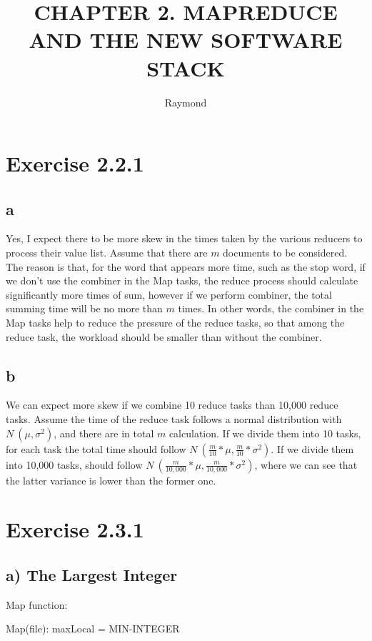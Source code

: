 \documentclass{article}
\title{CHAPTER 2. MAPREDUCE AND THE NEW SOFTWARE STACK}
\author{Raymond}
\begin{document}
\maketitle


\section{Exercise 2.2.1}
\subsection{a}
Yes, I expect there to be more skew in the times taken by the various reducers to process their value list. Assume that there are $m$ documents to be considered. The reason is that, for the word that appears more time, such as the stop word, if we don't use the combiner in the Map tasks, the reduce process should calculate significantly more times of sum, however if we perform combiner, the total summing time will be no more than $m$ times. In other words, the combiner in the Map tasks help to reduce the pressure of the reduce tasks, so that among the reduce task, the workload should be smaller than without the combiner. 

\subsection{b}

We can expect more skew if we combine 10 reduce tasks than 10,000 reduce tasks. Assume the time of the reduce task follows a normal distribution with $N~(\mu,\sigma^2)$, and there are in total $m$ calculation. If we divide them into 10 tasks, for each task the total time should follow $N~(\frac{m}{10}*\mu,\frac{m}{10}*\sigma^2)$. If we divide them into 10,000 tasks, should follow $N~(\frac{m}{10,000}*\mu,\frac{m}{10,000}*\sigma^2)$, where we can see that the latter variance is lower than the former one. 

\section{Exercise 2.3.1}

\subsection{a) The Largest Integer}

Map function:

Map(file):
maxLocal = MIN-INTEGER
\end{document}
